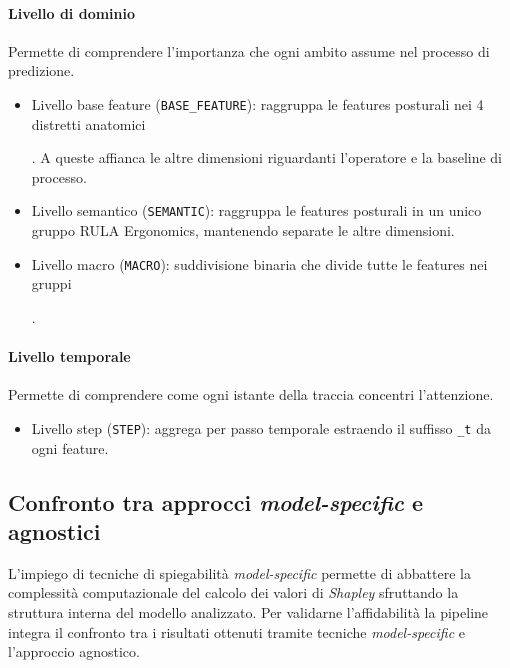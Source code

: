 \paragraph{Livello di dominio} Permette di comprendere l'importanza che ogni ambito assume nel processo di predizione.
\begin{itemize}
    \item Livello base feature (\texttt{BASE\_FEATURE}): raggruppa le features posturali nei 4 distretti anatomici
          . A queste affianca le altre dimensioni riguardanti l'operatore e la baseline di processo.

    \item Livello semantico (\texttt{SEMANTIC}): raggruppa le features posturali in un unico gruppo RULA Ergonomics, mantenendo separate le altre dimensioni.
    \item Livello macro (\texttt{MACRO}): suddivisione binaria che divide tutte le features nei gruppi
          .
\end{itemize}

\paragraph{Livello temporale} Permette di comprendere come ogni istante della traccia concentri l'attenzione.
\begin{itemize}
    \item Livello step (\texttt{STEP}): aggrega per passo temporale estraendo il suffisso \texttt{\_t} da ogni feature.
\end{itemize}


\subsection{Confronto tra approcci \textit{model-specific} e agnostici}
\label{subsec:explainer_comparison}
L'impiego di tecniche di spiegabilità \textit{model-specific} permette di abbattere la complessità computazionale del calcolo dei valori di \textit{Shapley} sfruttando la struttura interna del modello analizzato. Per validarne l'affidabilità la pipeline integra il confronto tra i risultati ottenuti tramite tecniche \textit{model-specific} e l'approccio agnostico.

